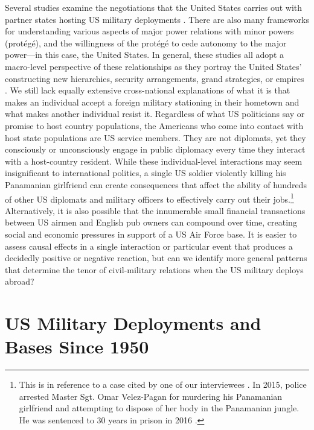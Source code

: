 Several studies examine the negotiations that the United States carries out with partner states hosting US military deployments \cite{McDonald1990}. There are also many frameworks for understanding various aspects of major power relations with minor powers (prot\'{e}g\'{e}), and the willingness of the prot\'{e}g\'{e} to cede autonomy to the major power---in this case, the United States. In general, these studies all adopt a macro-level perspective of these relationships as they portray the United States' constructing new hierarchies, security arrangements, grand strategies, or empires \cite{Ikenberry2004,Johnson2004,Bacevich2009,Lake2009a}. We still lack equally extensive cross-national explanations of what it is that makes an individual accept a foreign military stationing in their hometown and what makes another individual resist it. Regardless of what US politicians say or promise to host country populations, the Americans who come into contact with host state populations are US service members. They are not diplomats, yet they consciously or unconsciously engage in public diplomacy every time they interact with a host-country resident. While these individual-level interactions may seem insignificant to international politics, a single US soldier violently killing his Panamanian girlfriend can create consequences that affect the ability of hundreds of other US diplomats and military officers to effectively carry out their jobs.\footnote{This is in reference to a case cited by one of our interviewees \cite{amb20180713}. In 2015, police arrested Master Sgt. Omar Velez-Pagan for murdering his Panamanian girlfriend and attempting to dispose of her body in the Panamanian jungle. He was sentenced to 30 years in prison in 2016 \cite{ChicagoTribune2016}.} Alternatively, it is also possible that the innumerable small financial transactions between US airmen and English pub owners can compound over time, creating social and economic pressures in support of a US Air Force base. It is easier to assess causal effects in a single interaction or particular event that produces a decidedly positive or negative reaction, but can we identify more general patterns that determine the tenor of civil-military relations when the US military deploys abroad? 


\section*{US Military Deployments and Bases Since 1950}

